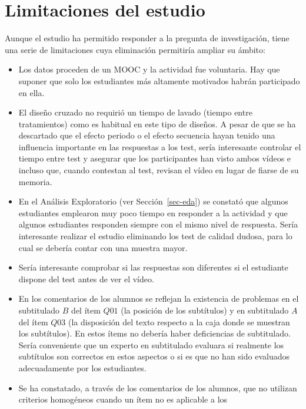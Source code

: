 \documentclass[
  12pt,
  a4paper,
  extrafontsizes,
  onecolumn,
  openright,
  table]{memoir}
\providecommand{\tightlist}{%
  \setlength{\itemsep}{0pt}\setlength{\parskip}{0pt}}\usepackage{longtable,booktabs,array}
\begin{document}
\hypertarget{limitaciones-del-estudio}{%
\section{Limitaciones del estudio}\label{limitaciones-del-estudio}}

Aunque el estudio ha permitido responder a la pregunta de investigación,
tiene una serie de limitaciones cuya eliminación permitiría ampliar su
ámbito:

\begin{itemize}
\tightlist
\item
  Los datos proceden de un MOOC y la actividad fue voluntaria. Hay que
  suponer que solo los estudiantes más altamente motivados habrán
  participado en ella.
\item
  El diseño cruzado no requirió un tiempo de lavado (tiempo entre
  tratamientos) como es habitual en este tipo de diseños. A pesar de que
  se ha descartado que el efecto periodo o el efecto secuencia hayan
  tenido una influencia importante en las respuestas a los test, sería
  interesante controlar el tiempo entre test y asegurar que los
  participantes han visto ambos vídeos e incluso que, cuando contestan
  al test, revisan el vídeo en lugar de fiarse de su memoria.
\item
  En el Análisis Exploratorio (ver Sección~\ref{sec-eda}) se constató
  que algunos estudiantes emplearon muy poco tiempo en responder a la
  actividad y que algunos estudiantes responden siempre con el mismo
  nivel de respuesta. Sería interesante realizar el estudio eliminando
  los test de calidad dudosa, para lo cual se debería contar con una
  muestra mayor.
\item
  Sería interesante comprobar si las respuestas son diferentes si el
  estudiante dispone del test antes de ver el vídeo.
\item
  En los comentarios de los alumnos se reflejan la existencia de
  problemas en el subtitulado \(B\) del ítem \(Q01\) (la posición de los
  subtítulos) y en subtitulado \(A\) del ítem \(Q03\) (la disposición
  del texto respecto a la caja donde se muestran los subtítulos). En
  estos ítems no debería haber deficiencias de subtitulado. Sería
  conveniente que un experto en subtitulado evaluara si realmente los
  subtítulos son correctos en estos aspectos o si es que no han sido
  evaluados adecuadamente por los estudiantes.
\item
  Se ha constatado, a través de los comentarios de los alumnos, que no
  utilizan criterios homogéneos cuando un ítem no es aplicable a los

\end{itemize}
\end{document}
